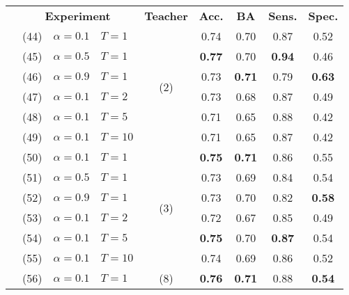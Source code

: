 \begin{table}
    \centering
    \begin{tabular}{c|lll|c|c|c|c|c|}
        \hhline{~--------}
        & \multicolumn{3}{|c|}{\textbf{Experiment}} & \textbf{Teacher} & \textbf{Acc.} & \textbf{BA} & \textbf{Sens.} & \textbf{Spec.} \\
        \hhline{~========}
        & (44) & $\alpha=0.1$ & $T=1$  & \multirow{6}{*}{(2)} &         0.74  &         0.70  &         0.87  &         0.52  \\
        & (45) & $\alpha=0.5$ & $T=1$  &                      & \textbf{0.77} &         0.70  & \textbf{0.94} &         0.46  \\
        & (46) & $\alpha=0.9$ & $T=1$  &                      &         0.73  & \textbf{0.71} &         0.79  & \textbf{0.63} \\
        & (47) & $\alpha=0.1$ & $T=2$  &                      &         0.73  &         0.68  &         0.87  &         0.49  \\
        & (48) & $\alpha=0.1$ & $T=5$  &                      &         0.71  &         0.65  &         0.88  &         0.42  \\
        & (49) & $\alpha=0.1$ & $T=10$ &                      &         0.71  &         0.65  &         0.87  &         0.42  \\
        \hhline{~--------}
        & (50) & $\alpha=0.1$ & $T=1$  & \multirow{6}{*}{(3)} & \textbf{0.75} & \textbf{0.71} &         0.86  &         0.55  \\
        & (51) & $\alpha=0.5$ & $T=1$  &                      &         0.73  &         0.69  &         0.84  &         0.54  \\
        & (52) & $\alpha=0.9$ & $T=1$  &                      &         0.73  &         0.70  &         0.82  & \textbf{0.58} \\
        & (53) & $\alpha=0.1$ & $T=2$  &                      &         0.72  &         0.67  &         0.85  &         0.49  \\
        & (54) & $\alpha=0.1$ & $T=5$  &                      & \textbf{0.75} &         0.70  & \textbf{0.87} &         0.54  \\
        & (55) & $\alpha=0.1$ & $T=10$ &                      &         0.74  &         0.69  &         0.86  &         0.52  \\
        \hhline{~--------}
        & (56) & $\alpha=0.1$ & $T=1$  & \multirow{6}{*}{(8)} & \textbf{0.76} & \textbf{0.71} &         0.88  & \textbf{0.54} \\

\end{tabular}
\end{table}
